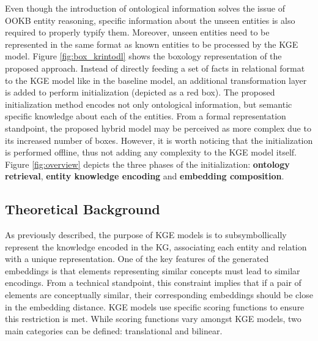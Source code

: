 Even though the introduction of ontological information solves the issue of OOKB entity reasoning, specific information about the unseen entities is also required to properly typify them. Moreover, unseen entities need to be represented in the same format as known entities to be processed by the KGE model. Figure \ref{fig:box_krintodl} shows the boxology representation of the proposed approach. Instead of directly feeding a set of facts in relational format to the KGE model like in the baseline model, an additional transformation layer is added to perform initialization (depicted as a red box). The proposed initialization method encodes not only ontological information, but semantic specific knowledge about each of the entities. From a formal representation standpoint, the proposed hybrid model may be perceived as more complex due to its increased number of boxes. However, it is worth noticing that the initialization is performed offline, thus not adding any complexity to the KGE model itself. Figure \ref{fig:overview} depicts the three phases of the initialization: \textbf{ontology retrieval}, \textbf{entity knowledge encoding} and \textbf{embedding composition}.

\subsection{Theoretical Background} \label{subsec:s4_theoretical_back}
As previously described, the purpose of KGE models is to subsymbollically represent the knowledge encoded in the KG, associating each entity and relation with a unique representation. One of the key features of the generated embeddings is that elements representing similar concepts must lead to similar encodings. From a technical standpoint, this constraint implies that if a pair of elements are conceptually similar, their corresponding embeddings should be close in the embedding distance. KGE models use specific scoring functions to ensure this restriction is met. While scoring functions vary amongst KGE models, two main categories can be defined: translational and bilinear. 


